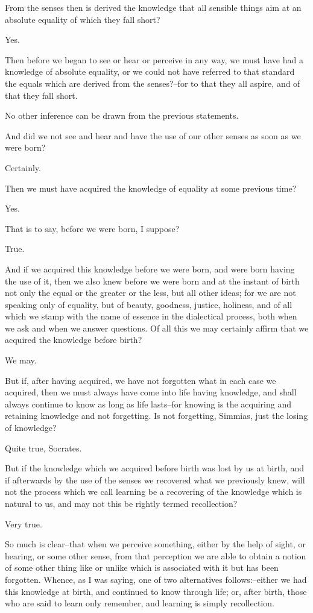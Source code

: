 From the senses then is derived the knowledge that all sensible things
aim at an absolute equality of which they fall short?

Yes.

Then before we began to see or hear or perceive in any way, we must have
had a knowledge of absolute equality, or we could not have referred to
that standard the equals which are derived from the senses?--for to that
they all aspire, and of that they fall short.

No other inference can be drawn from the previous statements.

And did we not see and hear and have the use of our other senses as soon
as we were born?

Certainly.

Then we must have acquired the knowledge of equality at some previous
time?

Yes.

That is to say, before we were born, I suppose?

True.

And if we acquired this knowledge before we were born, and were born
having the use of it, then we also knew before we were born and at the
instant of birth not only the equal or the greater or the less, but all
other ideas; for we are not speaking only of equality, but of beauty,
goodness, justice, holiness, and of all which we stamp with the name of
essence in the dialectical process, both when we ask and when we answer
questions. Of all this we may certainly affirm that we acquired the
knowledge before birth?

We may.

But if, after having acquired, we have not forgotten what in each case
we acquired, then we must always have come into life having knowledge,
and shall always continue to know as long as life lasts--for knowing
is the acquiring and retaining knowledge and not forgetting. Is not
forgetting, Simmias, just the losing of knowledge?

Quite true, Socrates.

But if the knowledge which we acquired before birth was lost by us at
birth, and if afterwards by the use of the senses we recovered what
we previously knew, will not the process which we call learning be a
recovering of the knowledge which is natural to us, and may not this be
rightly termed recollection?

Very true.

So much is clear--that when we perceive something, either by the help of
sight, or hearing, or some other sense, from that perception we are
able to obtain a notion of some other thing like or unlike which is
associated with it but has been forgotten. Whence, as I was saying, one
of two alternatives follows:--either we had this knowledge at birth, and
continued to know through life; or, after birth, those who are said to
learn only remember, and learning is simply recollection.

